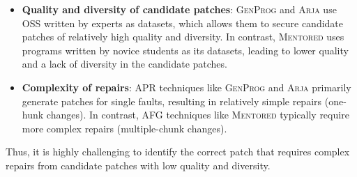 \documentclass[10pt,conference]{IEEEtran}
\begin{document}
        \begin{itemize}
            \item \textbf{Quality and diversity of candidate patches}: \textsc{GenProg} and \textsc{Arja} use OSS written by experts as datasets, which allows them to secure candidate patches of relatively high quality and diversity. In contrast, \textsc{Mentored} uses programs written by novice students as its datasets, leading to lower quality and a lack of diversity in the candidate patches.
            
            \item \textbf{Complexity of repairs}: APR techniques like \textsc{GenProg} and \textsc{Arja} primarily generate patches for single faults, resulting in relatively simple repairs (one-hunk changes). In contrast, AFG techniques like \textsc{Mentored} typically require more complex repairs (multiple-chunk changes).
        \end{itemize}

        Thus, it is highly challenging to identify the correct patch that requires complex repairs from candidate patches with low quality and diversity.
\end{document}
